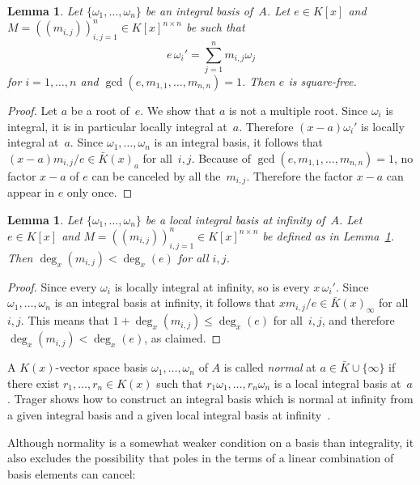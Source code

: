 \documentclass{sig-alternate}
\newtheorem{lemma}[theorem]{Lemma}
\begin{document}
\begin{lemma}\label{lemma:e}
  Let $\{\omega_1,\dots,\omega_n\}$ be an integral basis of~$A$.
  Let $e\in K[x]$ and
  $M=((m_{i,j}))_{i,j=1}^n\in K[x]^{n\times n}$ be such that
  \[
    e\,\omega_i'=\sum_{j=1}^n m_{i,j}\omega_j
  \]
  for $i=1,\dots,n$ and $\gcd(e,m_{1,1},\dots,m_{n,n})=1$.
  Then $e$ is square-free.
\end{lemma}
\begin{proof}
  Let $a$ be a root of~$e$. We show that $a$ is not a multiple root.
  Since $\omega_i$ is integral, it is in particular locally integral at~$a$.
  Therefore $(x-a)\omega_i'$ is locally integral at~$a$.
  Since $\omega_1,\dots,\omega_n$ is an integral basis, it follows that
  $(x-a)m_{i,j}/e\in\bar K(x)_a$ for all~$i,j$.
  Because of $\gcd(e,m_{1,1},\dots,m_{n,n})=1$, no factor $x-a$ of $e$
  can be canceled by all the~$m_{i,j}$.
  Therefore the factor $x-a$ can appear in $e$ only once.
\end{proof}

\begin{lemma} \label{lemma:degM}
  Let $\{\omega_1,\dots,\omega_n\}$ be a local integral basis at infinity of~$A$. 
  Let $e\in K[x]$ and $M=((m_{i,j}))_{i,j=1}^n\in K[x]^{n\times n}$
  be defined as in Lemma~\ref{lemma:e}. Then $\deg_x(m_{i,j})<\deg_x(e)$ for all $i,j$.
\end{lemma}
\begin{proof}
  Since every $\omega_i$ is locally integral at infinity, so is every $x\,\omega_i'$.
  Since $\omega_1,\dots,\omega_n$ is an integral basis at infinity, it follows that
  $xm_{i,j}/e\in\bar K(x)_\infty$ for all~$i,j$. This means that $1+\deg_x(m_{i,j})\leq\deg_x(e)$
  for all~$i,j$, and therefore $\deg_x(m_{i,j})<\deg_x(e)$, as claimed.
\end{proof}

A $K(x)$-vector space basis $\omega_1,\dots,\omega_n$ of $A$ is
called \emph{normal} at $a\in\bar K\cup\{\infty\}$ if there exist $r_1,\dots,r_n\in
K(x)$ such that $r_1\omega_1,\dots,r_n\omega_n$ is a local integral basis
at~$a$. Trager shows how to construct
an integral basis which is normal at infinity from a given integral basis and
a given local integral basis at infinity~\cite{trager84}. 

Although normality is a somewhat weaker condition on a basis than integrality,
it also excludes the possibility that poles in the terms of a linear combination
of basis elements can cancel:
\end{document}
